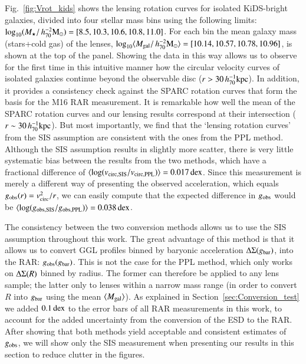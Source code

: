 \documentclass{aa}
\newcommand{\hmsun}{\,h_{70}^{-2} {\rm M_\odot}}
\newcommand{\hkpc}{\,h_{70}^{-1}{\rm{kpc}} }
\newcommand{\dex}{\,{\rm dex}}
\renewcommand{\Upsigma}{{\rm \Sigma}}
\renewcommand{\Updelta}{{\rm \Delta}}
\newcommand{\lan}{\langle}
\newcommand{\ran}{\rangle}
\newcommand*{\meanb}[1]{\langle{#1}\rangle}
\newcommand{\un}[1]{_{\rm #1}}
\begin{document}
Fig.~\ref{fig:Vrot_kids} shows the lensing rotation curves for isolated KiDS-bright galaxies, divided into four stellar mass bins using the following limits: $\log_{10}(M_\star/\hmsun) = [8.5,10.3,10.6,10.8,11.0]$. For each bin the mean galaxy mass (stars+cold gas) of the lenses, $\log_{10}\lan M\un{gal}/\hmsun \ran = [10.14, 10.57, 10.78, 10.96]$, is shown at the top of the panel. Showing the data in this way allows us to observe for the first time in this intuitive manner how the circular velocity curves of isolated galaxies continue beyond the observable disc ($r>30\hkpc$). In addition, it provides a consistency check against the SPARC rotation curves \cite[]{lelli2016b} that form the basis for the M16 RAR measurement. It is remarkable how well the mean of the SPARC rotation curves and our lensing results correspond at their intersection ($r\sim 30 \hkpc$). But most importantly, we find that the `lensing rotation curves' from the SIS assumption are consistent with the ones from the PPL method. Although the SIS assumption results in slightly more scatter, there is very little systematic bias between the results from the two methods, which have a fractional difference of $\meanb{\log(v\un{circ, SIS} / v\un{circ, PPL})} = 0.017 \dex$. Since this measurement is merely a different way of presenting the observed acceleration, which equals $g\un{obs}(r) = v\un{circ}^2 / r$, we can easily compute that the expected difference in $g\un{obs}$ would be $\meanb{\log(g\un{obs, SIS} / g\un{obs, PPL})} = 0.038 \dex$.

The consistency between the two conversion methods allows us to use the SIS assumption throughout this work. The great advantage of this method is that it allows us to convert GGL profiles binned by baryonic acceleration $\Updelta\Upsigma(g\un{bar})$, into the RAR: $g\un{obs}(g\un{bar})$. This is not the case for the PPL method, which only works on $\Updelta\Upsigma(R)$ binned by radius. The former can therefore be applied to any lens sample; the latter only to lenses within a narrow mass range (in order to convert $R$ into $g\un{bar}$ using the mean $\meanb{M\un{gal}}$). As explained in Section~\ref{sec:Conversion_test} we added $0.1 \dex$ to the error bars of all RAR measurements in this work, to account for the added uncertainty from the conversion of the ESD to the RAR. After showing that both methods yield acceptable and consistent estimates of $g\un{obs}$, we will show only the SIS measurement when presenting our results in this section to reduce clutter in the figures.
\end{document}
